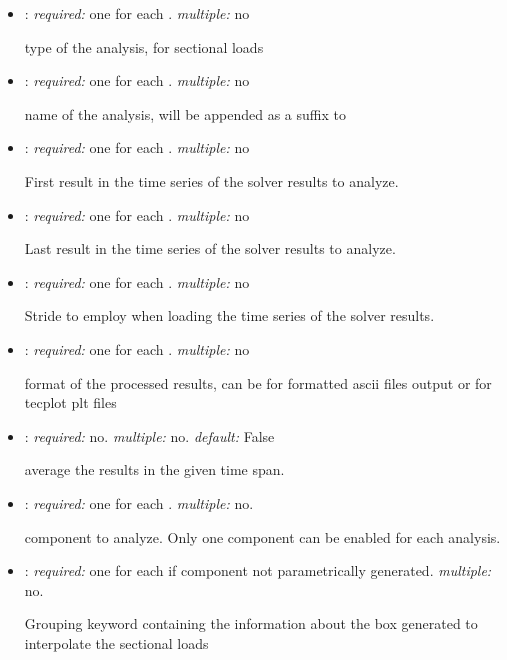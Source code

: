 \begin{itemize}
\item {}: \textit{required:} one for each . \textit{multiple:} no

type of the analysis,  for sectional loads

\item {}: \textit{required:} one for each . \textit{multiple:} no

name of the analysis, will be appended as a suffix to 

\item {}: \textit{required:} one for each . 
\textit{multiple:} no

First result in the time series of the solver results to analyze.

\item {}: \textit{required:} one for each . 
\textit{multiple:} no

Last result in the time series of the solver results to analyze.

\item {}: \textit{required:} one for each . 
\textit{multiple:} no

Stride to employ when loading the time series of the solver results. 

\item {}: \textit{required:} one for each . 
\textit{multiple:} no

format of the processed results, can be  for formatted ascii files 
output or  for tecplot plt files

\item {}: \textit{required:} no. \textit{multiple:} no. 
\textit{default:} False

average the results in the given time span.

\item {}: \textit{required:} one for each . 
\textit{multiple:} no.

component to analyze. Only one component can be enabled for each analysis. 

\item {}: \textit{required:} one for each  
if component not parametrically generated. \textit{multiple:} no.

Grouping keyword containing the information about the box generated to 
interpolate the sectional loads


\end{itemize}
